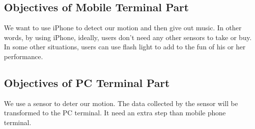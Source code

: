 \subsection{Objectives of Mobile Terminal Part}

We want to use iPhone to detect our motion and then give out music. In other
words, by using iPhone, ideally, users don’t need any other sensors to take or
buy. In some other situations, users can use flash light to add to the fun of
his or her performance. 

\subsection{Objectives of PC Terminal Part}

We use a sensor to deter our motion. The data collected by the sensor will be
transformed to the PC terminal. It need an extra step than mobile phone
terminal. 


